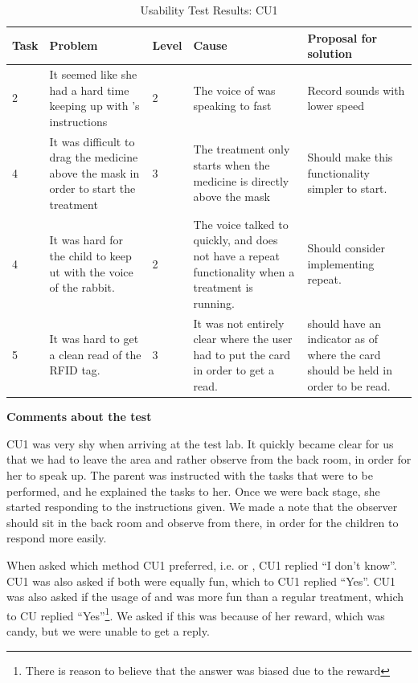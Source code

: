 \begin{table}[H]
\centering
\begin{tabular}{| p{1.0cm} | p{4.0cm} | p{0.9cm} | p{3.6cm} | p{3.1cm} |}
\hline
	\textbf{Task} & \textbf{Problem} & \textbf{Level} & \textbf{Cause} & \textbf{Proposal for solution} \\
	\hline
	2 & It seemed like she had a hard time keeping up with \ab{}'s instructions & 2 & The voice of \ab{} was speaking to fast & Record sounds with lower speed \\
	\hline
	4 & It was difficult to drag the medicine above the mask in order to start the treatment & 3 & The treatment only starts when the medicine is directly above the mask & Should make this functionality simpler to start.  \\
	\hline
	4 & It was hard for the child to keep ut with the voice of the rabbit. & 2 & The voice talked to quickly, and \app{} does not have a repeat functionality when a treatment is running. & Should consider implementing repeat.\\ 
	\hline
	5 & It was hard to get a clean read of the RFID tag. & 3 & It was not entirely clear where the user had to put the card in order to get a read. & \ab{} should have an indicator as of where the card should be held in order to be read.  \\
	\hline
\end{tabular}
\caption{Usability Test Results: CU1}
\label{tab:testchild1}
\end{table}

\textbf{Comments about the test}

CU1 was very shy when arriving at the test lab. It quickly became clear for us that we had to leave the area and rather observe from the back room, in order for her to speak up. The parent was instructed with the tasks that were to be performed, and he explained the tasks to her. Once we were back stage, she started responding to the instructions given. We made a note that the observer should sit in the back room and observe from there, in order for the children to respond more easily.   

When asked which method CU1 preferred, i.e. \app{} or \ab{}, CU1 replied ``I don't know''. CU1 was also asked if both were equally fun, which to CU1 replied ``Yes''. CU1 was also asked if the usage of \app{} and \ab{} was more fun than a regular treatment, which to CU replied ``Yes''\footnote{There is reason to believe that the answer was biased due to the reward}. We asked if this was because of her reward, which was candy, but we were unable to get a reply. 

